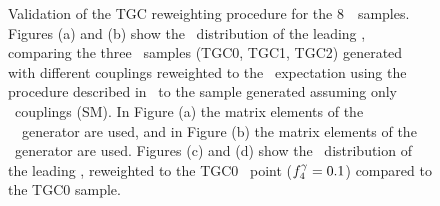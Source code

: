 \begin{figure}[htbp]
\begin{center}
\caption{
\small
Validation of the TGC reweighting procedure for the 8~\tev\ samples. Figures (a) and (b) show the \pt\
distribution of the leading \leppair, comparing the three \TGC\ samples (TGC0,
TGC1, TGC2) generated with different couplings reweighted to the \sm\
expectation using the procedure described in~ to the sample
generated assuming only \sm\ couplings (SM). In Figure (a) the matrix elements
of the \BR\ \mc\ generator are used, and in Figure (b) the matrix elements of
the \BHO\ generator are used. Figures (c) and (d) show the  \pt\
distribution of the leading \leppair, reweighted to the TGC0 \TGC\ point
($f_{4}^{\gamma}=0.1$) compared to the TGC0 sample.
 }
\label{fig:TGC-reweight}
\end{center}
\end{figure}


